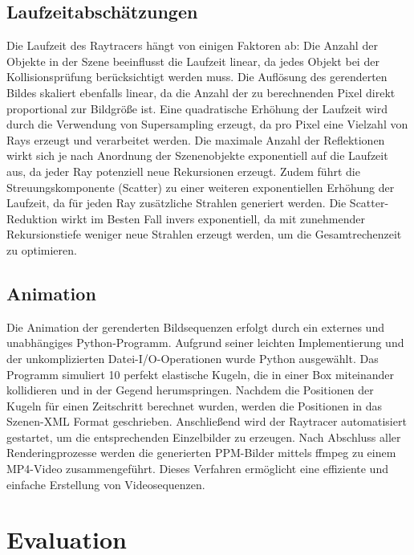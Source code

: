 \documentclass[sigconf]{acmart}
\begin{document}
\subsection{Laufzeitabschätzungen} \label{Laufzeit}
Die Laufzeit des Raytracers hängt von einigen Faktoren ab:
Die Anzahl der Objekte in der Szene beeinflusst die Laufzeit linear, da jedes Objekt bei der Kollisionsprüfung berücksichtigt werden muss.
Die Auflösung des gerenderten Bildes skaliert ebenfalls linear, da die Anzahl der zu berechnenden Pixel direkt proportional zur Bildgröße ist.
Eine quadratische Erhöhung der Laufzeit wird durch die Verwendung von Supersampling erzeugt, da pro Pixel eine Vielzahl von Rays erzeugt und verarbeitet werden.
Die maximale Anzahl der Reflektionen wirkt sich je nach Anordnung der Szenenobjekte exponentiell auf die Laufzeit aus, da jeder Ray potenziell neue Rekursionen erzeugt.
Zudem führt die Streuungskomponente (Scatter) zu einer weiteren exponentiellen Erhöhung der Laufzeit, da für jeden Ray zusätzliche Strahlen generiert werden.
Die Scatter-Reduktion wirkt im Besten Fall invers exponentiell, da mit zunehmender Rekursionstiefe weniger neue Strahlen erzeugt werden, um die Gesamtrechenzeit zu optimieren.

\subsection{Animation} \label{Animation}
Die Animation der gerenderten Bildsequenzen erfolgt durch ein externes und unabhängiges Python-Programm.
Aufgrund seiner leichten Implementierung und der unkomplizierten Datei-I/O-Operationen wurde Python ausgewählt.
Das Programm simuliert 10 perfekt elastische Kugeln, die in einer Box miteinander kollidieren und in der Gegend herumspringen.
Nachdem die Positionen der Kugeln für einen Zeitschritt berechnet wurden, werden die Positionen in das Szenen-XML Format geschrieben.
Anschließend wird der Raytracer automatisiert gestartet, um die entsprechenden Einzelbilder zu erzeugen.
Nach Abschluss aller Renderingprozesse werden die generierten PPM-Bilder mittels ffmpeg zu einem MP4-Video zusammengeführt.
Dieses Verfahren ermöglicht eine effiziente und einfache Erstellung von Videosequenzen.

\section{Evaluation} \label{Evaluation}
\end{document}
